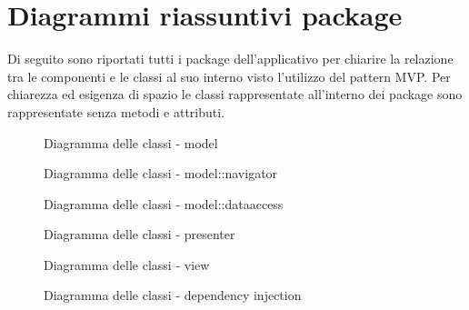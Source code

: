 \documentclass[../DefinizioneDiProdotto.tex,lanscape]{subfiles}
\begin{document}
\section{Diagrammi riassuntivi package}
	Di seguito sono riportati tutti i package dell'applicativo per chiarire la relazione tra le componenti e le classi al suo interno visto l'utilizzo del pattern MVP. Per chiarezza ed esigenza di spazio le classi rappresentate all'interno dei package sono rappresentate senza metodi e attributi.


\begin{figure}[H]
	\label{modelPackage}
	\caption{Diagramma delle classi - model}
\end{figure}

\begin{figure}[H]
	\label{navigatorPackage}
	\caption{Diagramma delle classi - model::navigator}
\end{figure}

\begin{figure}[H]
	\label{dataaccessPackage}
	\caption{Diagramma delle classi - model::dataaccess}
\end{figure}

\begin{figure}[H]
	\label{presenterPackage}
	\caption{Diagramma delle classi - presenter}
\end{figure}

\begin{figure}[H]
	\centering
	\label{viewPackage}
	\caption{Diagramma delle classi - view}
\end{figure}

\begin{figure}[H]
	\centering
	\label{diPackage}
	\caption{Diagramma delle classi - dependency injection}
\end{figure}
\end{document}
